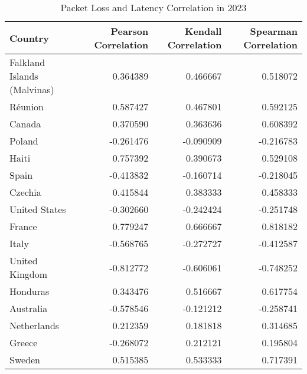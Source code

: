 \begin{table}
	\caption{Packet Loss and Latency Correlation in 2023}
	\label{fig:packetloss-latency-correlation-2023}
	\begin{tabular}{lrrr}
		\toprule
		Country                     & Pearson Correlation & Kendall Correlation & Spearman Correlation \\
		\midrule
		Falkland Islands (Malvinas) & 0.364389            & 0.466667            & 0.518072             \\
		Réunion                     & 0.587427            & 0.467801            & 0.592125             \\
		Canada                      & 0.370590            & 0.363636            & 0.608392             \\
		Poland                      & -0.261476           & -0.090909           & -0.216783            \\
		Haiti                       & 0.757392            & 0.390673            & 0.529108             \\
		Spain                       & -0.413832           & -0.160714           & -0.218045            \\
		Czechia                     & 0.415844            & 0.383333            & 0.458333             \\
		United States               & -0.302660           & -0.242424           & -0.251748            \\
		France                      & 0.779247            & 0.666667            & 0.818182             \\
		Italy                       & -0.568765           & -0.272727           & -0.412587            \\
		United Kingdom              & -0.812772           & -0.606061           & -0.748252            \\
		Honduras                    & 0.343476            & 0.516667            & 0.617754             \\
		Australia                   & -0.578546           & -0.121212           & -0.258741            \\
		Netherlands                 & 0.212359            & 0.181818            & 0.314685             \\
		Greece                      & -0.268072           & 0.212121            & 0.195804             \\
		Sweden                      & 0.515385            & 0.533333            & 0.717391             \\

\end{tabular}
\end{table}
